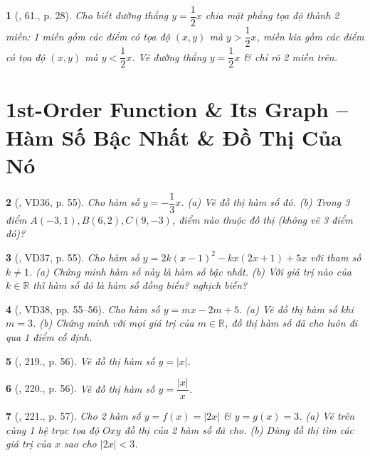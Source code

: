 \documentclass{article}
\newtheorem{baitoan}{}
\begin{document}
\begin{baitoan}[\cite{Binh_Toan_9_tap_1}, 61., p. 28]
	Cho biết đường thẳng $y = \dfrac{1}{2}x$ chia mặt phẳng tọa độ thành 2 miền: 1 miền gồm các điểm có tọa độ $(x,y)$ mà $y > \dfrac{1}{2}x$, miền kia gồm các điểm có tọa độ $(x,y)$ mà $y < \dfrac{1}{2}x$. Vẽ đường thẳng $y = \dfrac{1}{2}x$ \& chỉ rõ 2 miền trên.
\end{baitoan}


\section{1st-Order Function \& Its Graph -- Hàm Số Bậc Nhất \& Đồ Thị Của Nó}

\begin{baitoan}[\cite{Tuyen_Toan_8}, VD36, p. 55]
	Cho hàm số $y = -\dfrac{1}{3}x$. (a) Vẽ đồ thị hàm số đó. (b) Trong 3 điểm $A(-3,1),B(6,2),C(9,-3)$, điểm nào thuộc đồ thị (không vẽ 3 điểm đó)?
\end{baitoan}

\begin{baitoan}[\cite{Tuyen_Toan_8}, VD37, p. 55]
	Cho hàm số $y = 2k(x - 1)^2 - kx(2x + 1) + 5x$ với tham số $k\ne1$. (a) Chứng minh hàm số này là hàm số bậc nhất. (b) Với giá trị nào của $k\in\mathbb{R}$ thì hàm số đó là hàm số đồng biến? nghịch biến?
\end{baitoan}

\begin{baitoan}[\cite{Tuyen_Toan_8}, VD38, pp. 55--56]
	Cho hàm số $y = mx - 2m + 5$. (a) Vẽ đồ thị hàm số khi $m = 3$. (b) Chứng minh với mọi giá trị của $m\in\mathbb{R}$, đồ thị hàm số đã cho luôn đi qua 1 điểm cố định.
\end{baitoan}

\begin{baitoan}[\cite{Tuyen_Toan_8}, 219., p. 56]
	Vẽ đồ thị hàm số $y = |x|$.
\end{baitoan}

\begin{baitoan}[\cite{Tuyen_Toan_8}, 220., p. 56]
	Vẽ đồ thị hàm số $y = \dfrac{|x|}{x}$.
\end{baitoan}

\begin{baitoan}[\cite{Tuyen_Toan_8}, 221., p. 57]
	Cho 2 hàm số $y = f(x) = |2x|$ \& $y = g(x) = 3$. (a) Vẽ trên cùng 1 hệ trục tọa độ $Oxy$ đồ thị của 2 hàm số đã cho. (b) Dùng đồ thị tìm các giá trị của $x$ sao cho $|2x| < 3$.
\end{baitoan}
\end{document}
